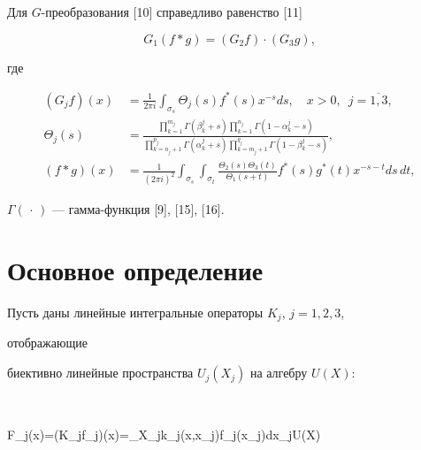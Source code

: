 \begin{exam}


Для $G$-преобразования [10] справедливо равенство [11]


\begin{equation}


G_1(f\ast g)=(G_2f)\cdot(G_3g),


\end{equation}


где


\begin{align*}


(G_jf)(x)&=\frac{1}{2\pi i}\int_{\sigma_s}\Theta_j(s)f^\ast(s)


x^{-s}ds,\quad x>0, \ \;j=\overline{1,3},\\


\Theta_j(s)&=


\frac{\prod\limits^{m_j}_{k=1}\Gamma(\beta^j_k+s)


\prod\limits^{n_j}_{k=1}\Gamma(1-\alpha^j_k-s)}


{\prod\limits^{p_j}_{k=n_j+1}\Gamma(\alpha^j_k+s)


\prod\limits^{q_j}_{k=m_j+1}\Gamma(1-\beta^j_k-s)},\\


(f\ast g)(x)&=\frac{1}{(2\pi i)^2}\int_{\sigma_s}\int_{\sigma_t}


\frac{\Theta_2(s)\Theta_3(t)}{\Theta_1(s+t)}f^\ast (s)g^\ast (t)


x^{-s-t}ds\,dt,


\end{align*}


$\Gamma(\,\cdot\,)$ --- гамма-функция [9], [15], [16].


\end{exam}





\section{Основное определение}





Пусть даны линейные интегральные операторы $K_j$, $j=1,2,3$,


отображающие


биективно линейные пространства $U_j(X_j)$ на алгебру $U(X)$:


$$


F_j(x)=(K_jf_j)(x)=\int_{X_j}k_j(x,x_j)f_j(x_j)dx_j\in U(X)\quad


